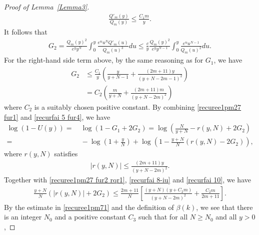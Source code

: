 \documentclass[12pt]{amsart}
\numberwithin{equation}{section}
\begin{document}
\begin{proof}[Proof of Lemma~\ref{Lemma3}]
\begin{equation*}
\begin{split}
\frac{Q'_m(y)}{Q_m(y)}\leq \frac{C_1m}{y}.
\end{split}
\end{equation*}
It follows that
\begin{equation}\label{recurfai   8}
\begin{split}
G_2=\frac{Q_m(y)^2}{e^yy^{N}}\int_0^{y}\frac{e^{u}u^{N}Q'_m(u)}{Q_m(u)^3}du\leq \frac{c}{y}\frac{Q_m(y)^2}{e^yy^{N-1}}\int_0^{y}\frac{e^{u}u^{N-1}}{Q_m(u)^2}du.
\end{split}
\end{equation}
For the right-hand side term above, by the same reasoning as for $G_1$, we have
\begin{equation}\label{recurfai   8-iu}
\begin{split}
G_2&\leq \frac{C_1}{y}\left(\frac{y}{y+N-1}+\frac{(2m+11)y}{(y+N-2m-1)^2}\right)\\
&=C_2\left(\frac{m}{y+N}+\frac{(2m+11)m}{(y+N-2m)^2}\right)
\end{split}
\end{equation}
where $C_2$ is a suitably chosen positive constant. By combining \eqref{recuree1pm27 fur1} and \eqref{recurfai   5 fur4}, we have
\begin{equation*}
\begin{split}
\log(1-U(y))=&\ \log \left(1-G_1+2G_2\right)=\log \left(\frac{N}{y+N}-r(y,N)+2G_2\right)\\
=&\ -\log \left(1+\frac{y}{N}\right)+\log \left(1-\frac{y+N}{N}\left(r(y,N)-2G_2\right)\right),
\end{split}
\end{equation*}
where $r(y,N)$ satisfies
\begin{equation}\label{recurfai   10}
\begin{split}
|r(y,N)|\leq \frac{(2m+11)y}{(y+N-2m)^2}.
\end{split}
\end{equation}
Together with \eqref{recuree1pm27 fur2 rqr1}, \eqref{recurfai   8-iu} and \eqref{recurfai   10}, we have
\begin{equation*}
\begin{split}
\frac{y+N}{N}(|r(y,N)|+2G_2)\leq \frac{2m+11}{N}\left[\frac{(y+N)(y+C_2m)}{(y+N-2m)^2}+\frac{C_2m}{2m+11}\right].
\end{split}
\end{equation*}
By the estimate in \eqref{recuree1pm71} and the definition of $\beta(k)$, we see that there is an integer $N_0$ and a positive constant $C_3$ such that for all $N\geq N_0$ and all $y>0$,

\end{proof}
\end{document}
